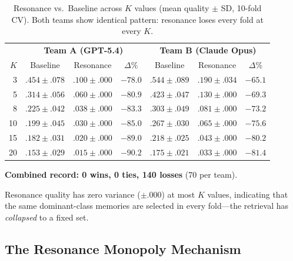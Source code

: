 \documentclass[11pt,a4paper]{article}
\begin{document}
\begin{table}[h]
\centering
\caption{Resonance vs.\ Baseline across $K$ values (mean quality $\pm$ SD, 10-fold CV). Both teams show identical pattern: resonance loses every fold at every $K$.}
\label{tab:results}
\small
\begin{tabular}{@{}r|ccc|ccc@{}}
\toprule
& \multicolumn{3}{c|}{\textbf{Team A (GPT-5.4)}} & \multicolumn{3}{c}{\textbf{Team B (Claude Opus)}} \\
$K$ & Baseline & Resonance & $\Delta$\% & Baseline & Resonance & $\Delta$\% \\
\midrule
3  & $.454 \pm .078$ & $.100 \pm .000$ & $-78.0$ & $.544 \pm .089$ & $.190 \pm .034$ & $-65.1$ \\
5  & $.314 \pm .056$ & $.060 \pm .000$ & $-80.9$ & $.423 \pm .047$ & $.130 \pm .000$ & $-69.3$ \\
8  & $.225 \pm .042$ & $.038 \pm .000$ & $-83.3$ & $.303 \pm .049$ & $.081 \pm .000$ & $-73.2$ \\
10 & $.199 \pm .045$ & $.030 \pm .000$ & $-85.0$ & $.267 \pm .030$ & $.065 \pm .000$ & $-75.6$ \\
15 & $.182 \pm .031$ & $.020 \pm .000$ & $-89.0$ & $.218 \pm .025$ & $.043 \pm .000$ & $-80.2$ \\
20 & $.153 \pm .029$ & $.015 \pm .000$ & $-90.2$ & $.175 \pm .021$ & $.033 \pm .000$ & $-81.4$ \\
\bottomrule
\end{tabular}
\end{table}

\textbf{Combined record: 0 wins, 0 ties, 140 losses} (70 per team).

Resonance quality has zero variance ($\pm .000$) at most $K$ values, indicating that the same dominant-class memories are selected in every fold---the retrieval has \emph{collapsed} to a fixed set.

\subsection{The Resonance Monopoly Mechanism}
\end{document}
